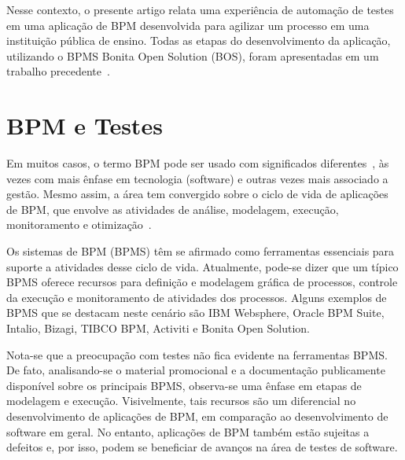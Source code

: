 \documentclass[12pt]{article}
\begin{document}
Nesse contexto, o presente artigo relata uma experiência de automação de testes em uma aplicação de BPM desenvolvida para agilizar um processo em uma instituição pública de ensino. Todas as etapas do desenvolvimento da aplicação, utilizando o BPMS Bonita Open Solution (BOS), foram apresentadas em um trabalho precedente~\cite{sbsi2013}. 


\section{BPM e Testes}

Em muitos casos, o termo BPM pode ser usado com significados diferentes~\cite{acmxrds2009}, às vezes com mais ênfase em tecnologia (software) e outras vezes mais associado a gestão. Mesmo assim, a área tem convergido sobre o ciclo de vida de aplicações de BPM, que envolve as atividades de análise, modelagem, execução, monitoramento e otimização~\cite{ABPMP}. 


Os sistemas de BPM (BPMS) têm se afirmado como ferramentas essenciais para suporte a atividades desse ciclo de vida. Atualmente, pode-se dizer que um típico BPMS oferece recursos para definição e modelagem gráfica de processos, controle da execução e monitoramento de atividades dos processos. Alguns exemplos de BPMS que se destacam neste cenário são IBM Websphere, Oracle BPM Suite, Intalio, Bizagi, TIBCO BPM, Activiti e Bonita Open Solution.

Nota-se que a preocupação com testes não fica evidente na ferramentas BPMS. De fato, analisando-se o material promocional e a documentação publicamente disponível sobre os principais BPMS, observa-se uma ênfase em etapas de modelagem e execução. Visivelmente, tais recursos são um diferencial no desenvolvimento de aplicações de BPM, em comparação ao desenvolvimento de software em geral. No entanto, aplicações de BPM também estão sujeitas a defeitos e, por isso, podem se beneficiar de avanços na área de testes de software.
\end{document}
